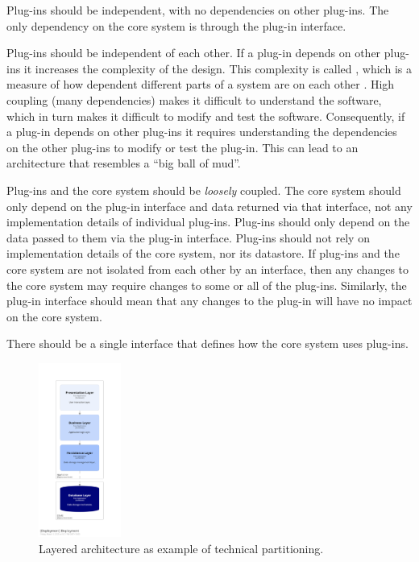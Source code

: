 \begin{definition}\label{independent-plug-in}
    Plug-ins should be independent, with no dependencies on other plug-ins.
    The only dependency on the core system is through the plug-in interface.
\end{definition}

Plug-ins should be independent of each other.
If a plug-in depends on other plug-ins it increases the complexity of the design.
This complexity is called ,
which is a measure of how dependent different parts of a system are on each other \cite{glossary-architecture}.
High coupling (many dependencies) makes it difficult to understand the software,
which in turn makes it difficult to modify and test the software.
Consequently, if a plug-in depends on other plug-ins it requires understanding the dependencies on the other plug-ins to modify or test the plug-in.
This can lead to an architecture that resembles a ``big ball of mud''.

Plug-ins and the core system should be \emph{loosely} coupled.
The core system should only depend on the plug-in interface and data returned via that interface, not any implementation details of individual plug-ins.
Plug-ins should only depend on the data passed to them via the plug-in interface.
Plug-ins should not rely on implementation details of the core system, nor its datastore.
If plug-ins and the core system are not isolated from each other by an interface,
then any changes to the core system may require changes to some or all of the plug-ins.
Similarly, the plug-in interface should mean that any changes to the plug-in will have no impact on the core system.

\vspace{1mm}
\begin{definition}\label{std-intf}
    There should be a single interface that defines how the core system uses plug-ins.
\end{definition}

\begin{figure}
    \vspace{-18pt}
    \centering
    \includegraphics[trim=197 197 197 197,clip,width=0.24\textwidth]{diagrams/technical-partitioning.png}
    \vspace{-20pt}
    \caption{Layered architecture as example of technical partitioning.}
    \label{fig:technical-partitioning}
\end{figure}

